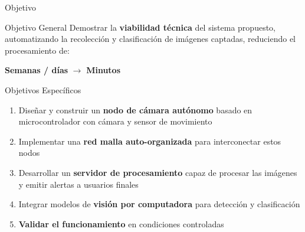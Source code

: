 \documentclass[10pt]{beamer}
\begin{document}
\begin{frame}{Objetivo}
  \begin{block}{Objetivo General}
    \centering \vspace{0.5em}
    Demostrar la \textbf{viabilidad técnica} del sistema propuesto, automatizando la recolección y clasificación de imágenes captadas, reduciendo el procesamiento de:
    
    \vspace{0.8em}
    {\large \textbf{Semanas / días} $\longrightarrow$ \textbf{Minutos}}
    \vspace{0.5em}
  \end{block}
\end{frame}

\begin{frame}{Objetivos Específicos}
  \begin{enumerate}
    \setlength{\itemsep}{1.5em}
    \item Diseñar y construir un \textbf{nodo de cámara autónomo} basado en microcontrolador con cámara y sensor de movimiento
    \item Implementar una \textbf{red malla auto-organizada} para interconectar estos nodos
    \item Desarrollar un \textbf{servidor de procesamiento} capaz de procesar las imágenes y emitir alertas a usuarios finales
    \item Integrar modelos de \textbf{visión por computadora} para detección y clasificación
    \item \textbf{Validar el funcionamiento} en condiciones controladas
\end{enumerate}
\end{frame}
\end{document}
